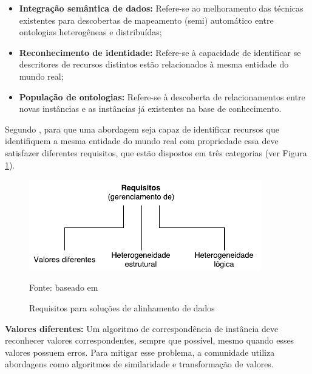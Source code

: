 \begin{itemize}
	\item \textbf{Integração semântica de dados:} Refere-se ao melhoramento das técnicas existentes para descobertas de mapeamento (semi) automático entre ontologias heterogêneas e distribuídas; 
	\item \textbf{Reconhecimento de identidade:} Refere-se à capacidade de identificar se descritores de recursos distintos estão relacionados à mesma entidade do mundo real; 
	\item\textbf{ População de ontologias:} Refere-se à descoberta de relacionamentos entre novas instâncias e as instâncias já existentes na base de conhecimento. 
\end{itemize}

Segundo , para que uma abordagem seja capaz de identificar recursos que identifiquem a mesma entidade do mundo real com propriedade essa deve satisfazer diferentes requisitos, que estão  dispostos em três categorias (ver Figura \ref{fig:imrequirements}).

\begin{figure}[!ht]
	\centering
	\includegraphics[width=0.9\textwidth]{./imagens/im_requirements.pdf}
    \caption{Requisitos para soluções de alinhamento de dados}
	\footnotesize{Fonte: baseado em \cite{ferrara2008towards}}
	\label{fig:imrequirements}
\end{figure}

\textbf{Valores diferentes:}
% 
% 
%
%
Um algoritmo de correspondência de instância deve reconhecer valores correspondentes, sempre que possível, mesmo quando esses valores possuem erros. Para mitigar esse problema, a comunidade utiliza abordagens como algoritmos de similaridade e transformação de valores.


